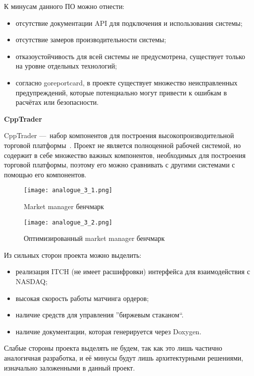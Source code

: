 К минусам данного ПО можно отнести:
\begin{itemize}
    \item отсутствие документации API для подключения и использования системы;
    \item отсутствие замеров производительности системы;
    \item отказоустойчивость для всей системы не предусмотрена, существует только на уровне отдельных технологий;
    \item согласно goreportcard, в проекте существует множество неисправленных предупреждений, которые потенциально могут привести к ошибкам в расчётах или безопасности.
\end{itemize}

\textbf{CppTrader}

CppTrader — набор компонентов для построения высокопроизводительной торговой платформы~\cite{analogue_3}. Проект не является полноценной рабочей системой, но содержит в себе множество важных компонентов, необходимых для построения торговой платформы, поэтому его можно сравнивать с другими системами с помощью его компонентов.

\begin{figure}[ht]
\centering
    \centering
    \texttt{[image: analogue\_3\_1.png]}
    \caption{Market manager бенчмарк}\label{fig:analysis:analogue_3:picture_1}
\end{figure}
\begin{figure}[ht]
    \centering
    \texttt{[image: analogue\_3\_2.png]}
    \caption{Оптимизированный market manager бенчмарк}\label{fig:analysis:analogue_3:picture_2}
\end{figure}

Из сильных сторон проекта можно выделить:
\begin{itemize}
    \item реализация ITCH (не имеет расшифровки) интерфейса для взаимодействия с NASDAQ;\@
    \item высокая скорость работы матчинга ордеров;
    \item наличие средств для управления ''биржевым стаканом``.
    \item наличие документации, которая генерируется через Doxygen.
\end{itemize}

Слабые стороны проекта выделять не будем, так как это лишь частично аналогичная разработка, и её минусы будут лишь архитектурными решениями, изначально заложенными в данный проект.
